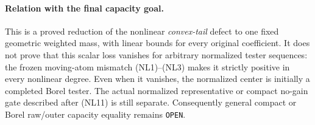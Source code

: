 \paragraph{Relation with the final capacity goal.}
This is a proved reduction of the nonlinear \emph{convex-tail}
defect to one fixed geometric weighted mass, with linear bounds
for every original coefficient.  It does not prove that this
scalar loss vanishes for arbitrary normalized tester sequences:
the frozen moving-atom mismatch (NL1)--(NL3) makes it strictly
positive in every nonlinear degree.  Even when it vanishes, the
normalized center is initially a completed Borel tester.  The
actual normalized representative or compact no-gain gate described
after (NL11) is still separate.  Consequently general compact or
Borel raw/outer capacity equality remains \texttt{OPEN}.
